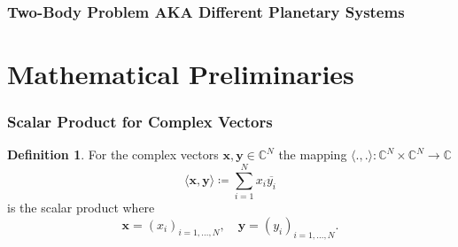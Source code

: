 \documentclass{beamer}
\theoremstyle{definition}
\newtheorem {Def} [Thm]{Definition}
\theoremstyle{remark}
\begin{document}
        \begin{frame}
          \frametitle{Two-Body Problem AKA Different Planetary Systems}
          \end{frame}

\section[Mathematical Preliminaries]{Mathematical Preliminaries}
\begin{frame}
  \frametitle{Scalar Product for Complex Vectors}
  \begin{Def}\label{def:scalar_product_complex_vectors}
    For the complex vectors $\boldsymbol{x},\boldsymbol{y} \in \mathbb{C}^N$ the mapping  $\langle\boldsymbol{.},\boldsymbol{.}\rangle \colon \mathbb{C}^N \times \mathbb{C}^N \to \mathbb{C}$ 
    \begin{equation}
        \langle\boldsymbol{x},\boldsymbol{y}\rangle \coloneqq \sum_{i=1}^{N} x_i \overline{y_i} 
    \end{equation}
    is the scalar product where
    \begin{equation}
        \boldsymbol{x} = \left(x_i\right)_{i=1,\ldots,N}, \quad \boldsymbol{y} = \left(y_i\right)_{i=1,\ldots,N}.
    \end{equation}    
\end{Def}
\end{frame}
\end{document}
